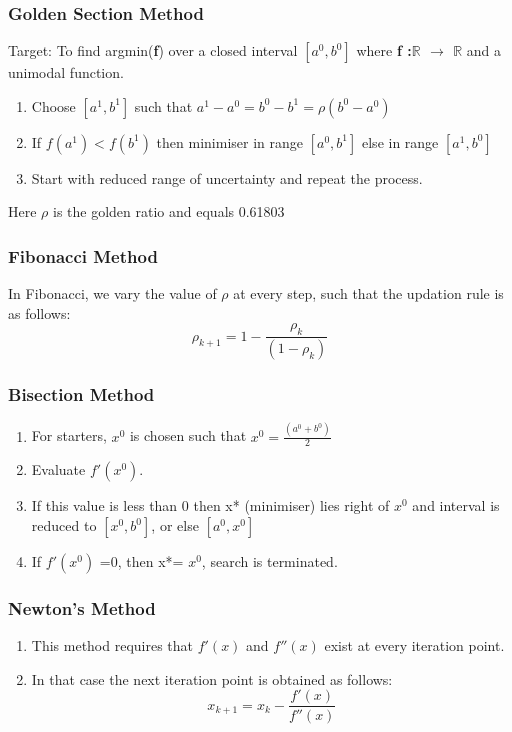 \documentclass[12pt,a4paper,titlepage]{article}
\begin{document}
\subsubsection{Golden Section Method}
Target: To find argmin(\textbf{f}) over a closed interval $[a^0, b^0]$ where \textbf{f :\textbf{$\mathbb{R}$ $\rightarrow$ $\mathbb{R}$}} and a unimodal function.
\begin{enumerate}
    \item Choose $[a^1, b^1]$ such that $a^1-a^0=b^0-b^1=\rho(b^0-a^0)$
    \item If $f(a^1) < f(b^1)$ then minimiser in range $[a^0, b^1]$ else in range $[a^1,b^0]$
    \item Start with reduced range of uncertainty and repeat the process.
\end{enumerate}
Here $\rho$ is the golden ratio and equals 0.61803
\subsubsection{Fibonacci Method}
In Fibonacci, we vary the value of $\rho$ at every step, such that the updation rule is as follows:
\begin{equation}
   \rho_{k+1}= 1- \frac{\rho_{k}}{(1-\rho_{k})}
\end{equation}
\subsubsection{Bisection Method}
\begin{enumerate}
    \item For starters, $x^0$ is chosen such that $x^0=\frac{(a^0+b^0)}{2}$
    \item Evaluate $f'(x^0)$.
    \item If this value is less than 0 then x* (minimiser) lies right of $x^0$ and interval is reduced to $[x^0, b^0]$, or else $[a^0, x^0]$ 
    \item If $f'(x^0)$ =0, then x*= $x^0$, search is terminated.
\end{enumerate}
\subsubsection{Newton's Method}
\begin{enumerate}
    \item This method requires that $f'(x)$ and $f''(x)$ exist at every iteration point.
    \item In that case the next iteration point is obtained as follows:
\begin{equation}
   x_{k+1}= x_{k}-\frac{f'(x)}{f''(x)}
\end{equation}
    \end{enumerate}
\end{document}
